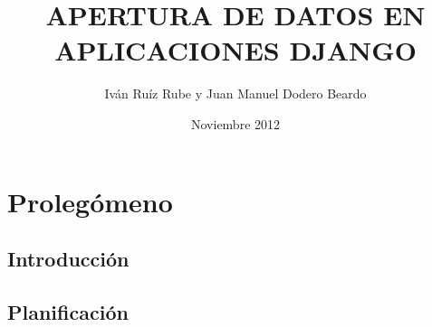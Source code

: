 \documentclass[a4paper,11pt]{book}
\title{APERTURA DE DATOS EN APLICACIONES DJANGO}
\author{Iván Ruíz Rube y Juan Manuel Dodero Beardo}
\date{Noviembre 2012}
\begin{document}
\nocite{*}



\cleardoublepage


\cleardoublepage


\newpage


\newpage


\frontmatter

\tableofcontents
\listoffigures
\listoftables

\mainmatter

\part{Prolegómeno}



\chapter{Introducción}


\chapter{Planificación}

\end{document}
